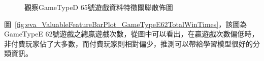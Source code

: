 \begin{figure}[!htb]
    \centering
    \caption[觀察GameTypeD 65號遊戲資料特徵關聯散佈圖]{觀察GameTypeD 65號遊戲資料特徵關聯散佈圖}
    \label{fig:eva_ValuableFeatureScatterPlot_GameTypeD65}
\end{figure}
\newpage

圖~\ref{fig:eva_ValuableFeatureBarPlot_GameTypeE62TotalWinTimes}，該圖為GameTypeE 62號遊戲之總贏遊戲次數，從圖中可以看出，在贏遊戲次數偏低時，非付費玩家佔了大多數，而付費玩家則相對偏少，推測可以帶給學習模型很好的分類資訊。

